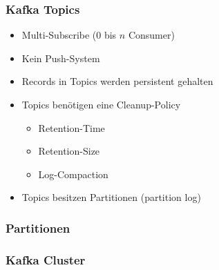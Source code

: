 \begin{frame}
\frametitle{Kafka Topics}
\begin{itemize}
	\item Multi-Subscribe ($0$ bis $n$ Consumer)
	\item Kein Push-System
	\item Records in Topics werden persistent gehalten
	\item Topics benötigen eine Cleanup-Policy
		\begin{itemize}
			\item Retention-Time
			\item Retention-Size
			\item Log-Compaction
		\end{itemize}
	\item Topics besitzen Partitionen (partition log)
\end{itemize}
\end{frame}

\begin{frame}
\frametitle{Partitionen}

\end{frame}

\begin{frame}
\frametitle{Kafka Cluster}

\end{frame}